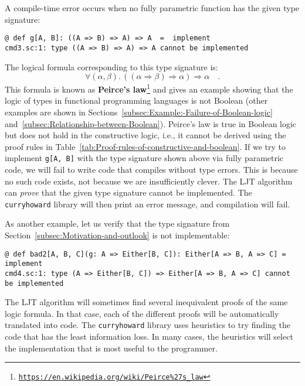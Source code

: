 A compile-time error occurs when no fully parametric function has
the given type signature:
\begin{lstlisting}
@ def g[A, B]: ((A => B) => A) => A  =  implement
cmd3.sc:1: type ((A => B) => A) => A cannot be implemented
\end{lstlisting}
The logical formula corresponding to this type signature is:
\begin{equation}
\forall(\alpha,\beta).\,\left(\left(\alpha\Rightarrow\beta\right)\Rightarrow\alpha\right)\Rightarrow\alpha\quad.\label{eq:ch-example-3-peirce-law}
\end{equation}
This formula is known as \textbf{Peirce\textsf{'}s law}\footnote{\texttt{\href{https://en.wikipedia.org/wiki/Peirce\%27s_law}{https://en.wikipedia.org/wiki/Peirce\%27s\_law}}}
and gives an example showing that the logic of types in functional
programming languages is not Boolean (other examples are shown in
Sections~\ref{subsec:Example:-Failure-of-Boolean-logic} and~\ref{subsec:Relationship-between-Boolean}).
Peirce\textsf{'}s law is true in Boolean logic but does not hold in the constructive
logic, i.e., it cannot be derived using the proof rules in Table~\ref{tab:Proof-rules-of-constructive-and-boolean}.
If we try to implement \lstinline!g[A, B]! with the type signature
shown above via fully parametric code, we will fail to write code
that compiles without type errors. This is because no such code exists,
\textemdash{} not because we are insufficiently clever. The LJT algorithm
can \emph{prove} that the given type signature cannot be implemented.
The \lstinline!curryhoward! library will then print an error message,
and compilation will fail.

As another example, let us verify that the type signature from Section~\ref{subsec:Motivation-and-outlook}
is not implementable:
\begin{lstlisting}
@ def bad2[A, B, C](g: A => Either[B, C]): Either[A => B, A => C] = implement
cmd4.sc:1: type (A => Either[B, C]) => Either[A => B, A => C] cannot be implemented
\end{lstlisting}

The LJT algorithm will sometimes find several inequivalent proofs
of the same logic formula. In that case, each of the different proofs
will be automatically translated into code. The \lstinline!curryhoward!
library uses heuristics to try finding the code that has the least
information loss. In many cases, the heuristics will select the implementation
that is most useful to the programmer.

